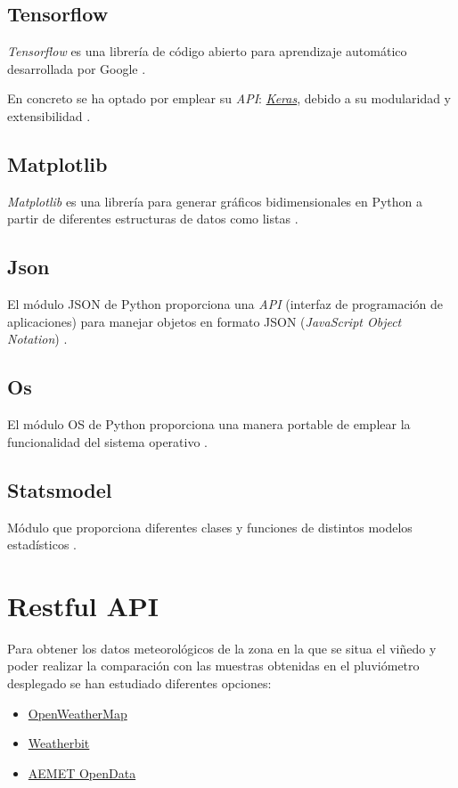\subsection{Tensorflow}
\textit{Tensorflow} es una librería de código abierto para aprendizaje automático desarrollada
por Google \cite{eswiki:tensorflow2021}.

En concreto se ha optado por emplear su \textit{API}: \href{https://keras.io/}{\textit{Keras}}, 
debido a su modularidad y extensibilidad \cite{eswiki:keras2022}.

\subsection{Matplotlib}
\textit{Matplotlib} es una librería para generar gráficos bidimensionales en Python a partir de 
diferentes estructuras de datos como listas \cite{eswiki:matplotlib2022}.

\subsection{Json}
El módulo JSON de Python proporciona una \textit{API} (interfaz de programación de 
aplicaciones) para manejar objetos en formato JSON (\textit{JavaScript Object 
Notation}) \cite{python:json2023}.

\subsection{Os}
El módulo OS de Python proporciona una manera portable de emplear la funcionalidad del
sistema operativo \cite{python:os2023}.

\subsection{Statsmodel}
Módulo que proporciona diferentes clases y funciones de distintos modelos estadísticos \cite{misc:perktold2023}.

\section{Restful API}
Para obtener los datos meteorológicos de la zona en la que se situa el viñedo y poder
realizar la comparación con las muestras obtenidas en el pluviómetro desplegado se han 
estudiado diferentes opciones:
\begin{itemize}
    \item \href{https://openweathermap.org/}{OpenWeatherMap}
    \item \href{https://www.weatherbit.io/}{Weatherbit}
    \item \href{https://www.aemet.es/es/datos_abiertos/AEMET_OpenData}{AEMET OpenData}
\end{itemize}

